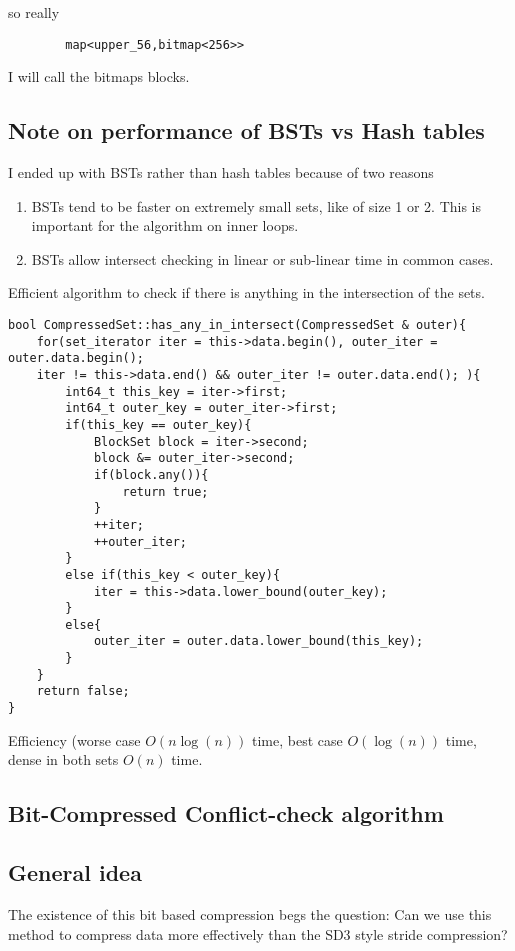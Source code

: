 \documentclass[12pt,twoside]{reedthesis}
\begin{document}
		so really

		\begin{verbatim}
		map<upper_56,bitmap<256>>
		\end{verbatim}

		I will call the bitmaps blocks.

		\subsection{Note on performance of BSTs vs Hash tables}

		I ended up with BSTs rather than hash tables because of two reasons
		\begin{enumerate}
			\item BSTs tend to be faster on extremely small sets, like of size 1 or 2. This is important for the algorithm on inner loops.
			\item BSTs allow intersect checking in linear or sub-linear time in common cases.
		\end{enumerate}

		Efficient algorithm to check if there is anything in the intersection of the sets.
\begin{lstlisting}
bool CompressedSet::has_any_in_intersect(CompressedSet & outer){
	for(set_iterator iter = this->data.begin(), outer_iter = outer.data.begin();
	iter != this->data.end() && outer_iter != outer.data.end(); ){
		int64_t this_key = iter->first;
		int64_t outer_key = outer_iter->first;
		if(this_key == outer_key){
			BlockSet block = iter->second;
			block &= outer_iter->second;
			if(block.any()){
				return true;
			}
			++iter;
			++outer_iter;
		}
		else if(this_key < outer_key){
			iter = this->data.lower_bound(outer_key);
		}
		else{
			outer_iter = outer.data.lower_bound(this_key);
		}
	}
	return false;
}
\end{lstlisting}
		Efficiency (worse case $O(n\log(n))$ time, best case $O(\log(n))$ time, dense in both sets $O(n)$ time.


	\subsection{Bit-Compressed Conflict-check algorithm}

		\subsection{General idea}

		The existence of this bit based compression begs the question: Can we use this method to compress data more effectively than the SD3 style stride compression?
\end{document}
